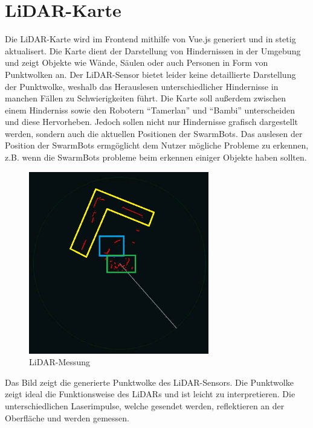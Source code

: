 \section{LiDAR-Karte}
\label{subsec:frontend_lidar_map}
Die LiDAR-Karte wird im Frontend mithilfe von Vue.js generiert und in stetig aktualisert. 
Die Karte dient der Darstellung von Hindernissen in der Umgebung und zeigt Objekte wie Wände, 
Säulen oder auch Personen in Form von Punktwolken an. 
%
Der LiDAR-Sensor bietet leider keine detaillierte Darstellung der Punktwolke, 
weshalb das Herauslesen unterschiedlicher Hindernisse in manchen Fällen zu Schwierigkeiten führt. 
%
Die Karte soll außerdem zwischen einem Hinderniss sowie den Robotern ``Tamerlan'' und ``Bambi'' 
unterscheiden und diese Hervorheben. 
%
Jedoch sollen nicht nur Hindernisse grafisch dargestellt werden, 
sondern auch die aktuellen Positionen der SwarmBots.
%
Das auslesen der Position der SwarmBots ermgöglicht dem Nutzer mögliche Probleme zu erkennen, 
z.B. wenn die SwarmBots probleme beim erkennen einiger Objekte haben sollten.  

\begin{figure}[H]
    \includegraphics[width=0.7\textwidth, center]{img/LiDARMessungZeichnung_alt.png}
    \caption{LiDAR-Messung}
    \label{fig:LiDAR-Messung}
\end{figure}

Das Bild zeigt die generierte Punktwolke des LiDAR-Sensors.
%
Die Punktwolke zeigt ideal die Funktionsweise des LiDARs
und ist leicht zu interpretieren.
%
Die unterschiedlichen Laserimpulse,
welche gesendet werden,
reflektieren an der Oberfläche und werden gemessen.

